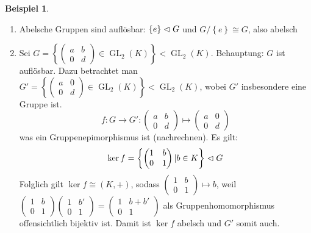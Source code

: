 \documentclass[12pt,a4paper]{article}
\theoremstyle{definition}
\theoremstyle{remark}
\theoremstyle{definition}
\theoremstyle{definition}
\newtheorem*{bsp}{Beispiel}
\theoremstyle{plain}
\theoremstyle{plain}
\DeclareMathOperator{\GL}{GL}
\begin{document}
\begin{bsp}
	\leavevmode
	\begin{enumerate}
		\item Abelsche Gruppen sind auflösbar: $\left\lbrace e \right\rbrace \vartriangleleft G$ und $G/\left\lbrace e \right\rbrace \cong G $, also abelsch
		\item Sei $G = \left\lbrace \begin{pmatrix}
		a & b \\ 
		0 & d
		\end{pmatrix} \in \GL_2(K) \right\rbrace < \GL_2(K) $. Behauptung: $G$ ist auflösbar. Dazu betrachtet man $G' = \left\lbrace \begin{pmatrix}
		a & 0 \\
		0 & d
		\end{pmatrix} \in \GL_2(K)\right\rbrace < \GL_2(K)$, wobei $G'$ insbesondere eine Gruppe ist. 
		\begin{equation*}
			f: G \rightarrow G': \begin{pmatrix}
			a & b \\ 
			0 & d
			\end{pmatrix} \mapsto \begin{pmatrix}
			a & 0 \\ 
			0 & d
			\end{pmatrix}
		\end{equation*}
		was ein Gruppenepimorphismus ist (nachrechnen). Es gilt: 
		\begin{equation*}
			\ker f = \left\lbrace \begin{pmatrix}
			1 & b \\ 
			0 & 1
			\end{pmatrix} \lvert b \in K \right\rbrace \vartriangleleft G
		\end{equation*}
		Folglich gilt $\ker f \cong (K, +)$, sodass $\begin{pmatrix}
		1 & b \\ 
		0 & 1
		\end{pmatrix} \mapsto b$, weil $\begin{pmatrix}
		1 & b \\ 
		0 & 1
		\end{pmatrix}\begin{pmatrix}
		1 & b' \\ 
		0 & 1
		\end{pmatrix}=\begin{pmatrix}
		1 & b + b' \\ 
		0 & 1
		\end{pmatrix}$ als Gruppenhomomorphismus offensichtlich bijektiv ist. Damit ist $\ker f$ abelsch und $G'$ somit auch.

\end{enumerate}
\end{bsp}
\end{document}
